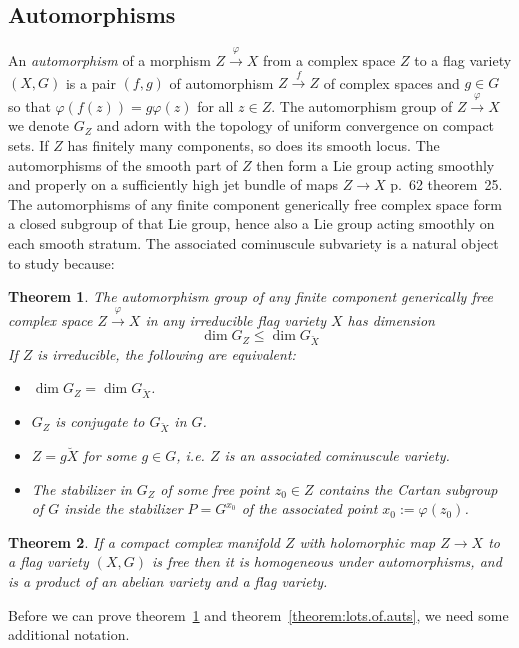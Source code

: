 \documentclass[a4paper,10pt]{amsart}
\newtheorem{theorem}{Theorem}
\theoremstyle{remark}
\begin{document}
\subsection{Automorphisms}\label{subsection:Freedom}
An \emph{automorphism} of a morphism \(Z\xrightarrow{\varphi}X\) from a complex space \(Z\) to a flag variety \((X,G)\) is a pair \((f,g)\) of automorphism \(Z\xrightarrow{f}Z\) of complex spaces and \(g\in G\) so that \(\varphi(f(z))=g\varphi(z)\) for all \(z\in Z\).
The automorphism group of \(Z\xrightarrow{\varphi}X\) we denote \(G_Z\) and adorn with the topology of uniform convergence on compact sets.
If \(Z\) has finitely many components, so does its smooth locus.
The automorphisms of the smooth part of \(Z\) then form a Lie group acting smoothly and properly on a sufficiently high jet bundle of maps \(Z\to X\) \cite{mckay2023introduction} p.~62 theorem~25.
The automorphisms of any finite component generically free complex space form a closed subgroup of that Lie group, hence also a Lie group acting smoothly on each smooth stratum.
The associated cominuscule subvariety is a natural object to study because:
\begin{theorem}\label{theorem:freedom}
The automorphism group of any finite component generically free complex space \(Z\xrightarrow{\varphi}X\) in any irreducible flag variety \(X\) has dimension 
\[
\dim G_Z\le \dim G_{\breve{X}}
\]
If \(Z\) is irreducible, the following are equivalent:
\begin{itemize}
\item
\(\dim G_Z=\dim G_{\breve{X}}\).
\item
\(G_Z\) is conjugate to \(G_{\breve{X}}\) in \(G\).
\item
\(Z=g\breve{X}\) for some \(g\in G\), i.e. \(Z\) is an associated cominuscule variety.
\item
The stabilizer in \(G_Z\) of some free point \(z_0\in Z\) contains the Cartan subgroup of \(G\) inside the stabilizer \(P=G^{x_0}\) of the associated point \(x_0:=\varphi(z_0)\).
\end{itemize}
\end{theorem}
\begin{theorem}\label{theorem:lots.of.auts}
If a compact complex manifold \(Z\) with holomorphic map \(Z\to X\) to a flag variety \((X,G)\) is free then it is homogeneous under automorphisms, and is a product of an abelian variety and a flag variety.
\end{theorem}
Before we can prove theorem~\ref{theorem:freedom} and theorem~\vref{theorem:lots.of.auts}, we need some additional notation.
\end{document}
